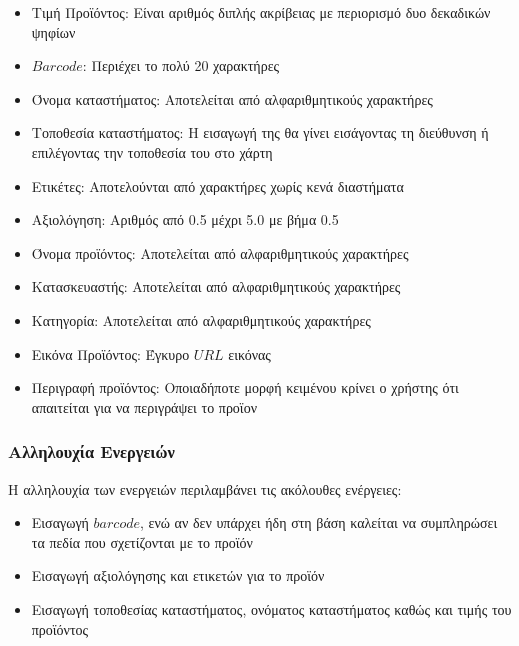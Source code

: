 \documentclass[12pt]{article}
\begin{document}
\begin{itemize}

\item Τιμή Προϊόντος: Είναι αριθμός διπλής ακρίβειας με περιορισμό δυο δεκαδικών ψηφίων

\item $Barcode$: Περιέχει το πολύ 20 χαρακτήρες

\item Όνομα καταστήματος: Αποτελείται από αλφαριθμητικούς χαρακτήρες

\item Τοποθεσία καταστήματος: Η εισαγωγή της θα γίνει εισάγοντας τη διεύθυνση ή επιλέγοντας την τοποθεσία του στο χάρτη

\item Ετικέτες: Αποτελούνται από χαρακτήρες χωρίς κενά διαστήματα

\item Αξιολόγηση: Aριθμός από 0.5 μέχρι 5.0 με βήμα 0.5

\item Όνομα προϊόντος: Aποτελείται από αλφαριθμητικούς χαρακτήρες

\item Κατασκευαστής: Aποτελείται από αλφαριθμητικούς χαρακτήρες

\item Κατηγορία: Aποτελείται από αλφαριθμητικούς χαρακτήρες

\item Εικόνα Προϊόντος: Έγκυρο $URL$ εικόνας
\item Περιγραφή προϊόντος: Οποιαδήποτε μορφή κειμένου κρίνει ο χρήστης ότι απαιτείται για να περιγράψει το προϊον
\end{itemize}

\subsubsection{Αλληλουχία Ενεργειών}

Η αλληλουχία των ενεργειών περιλαμβάνει τις ακόλουθες ενέργειες:

\begin{itemize}
\item Εισαγωγή $barcode$, ενώ αν δεν υπάρχει ήδη στη βάση καλείται να συμπληρώσει τα πεδία που σχετίζονται με το προϊόν
\item Εισαγωγή αξιολόγησης και ετικετών για το προϊόν
\item Εισαγωγή τοποθεσίας καταστήματος, ονόματος καταστήματος καθώς και τιμής του προϊόντος
\end{itemize}
\end{document}
